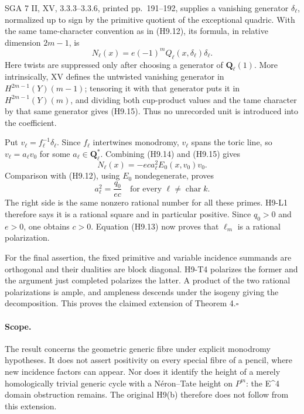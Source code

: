 SGA 7 II, XV, 3.3.3--3.3.6, printed pp.~191--192, supplies a vanishing generator
$\delta_\ell$, normalized up to sign by the primitive quotient of the
exceptional quadric. With the same tame-character convention as in
(H9.12), its formula, in relative dimension $2m-1$, is
\[
 N_\ell(x)=e(-1)^m Q_\ell(x,\delta_\ell)\delta_\ell.
                                                        \tag{H9.15}
\]
Here twists are suppressed only after choosing a generator of
$\mathbf Q_\ell(1)$. More intrinsically, XV defines the untwisted
vanishing generator in $H^{2m-1}(Y)(m-1)$; tensoring it with that
generator puts it in $H^{2m-1}(Y)(m)$, and dividing both cup-product
values and the tame character by that same generator gives (H9.15).
Thus no unrecorded unit is introduced into the coefficient.

Put $v_\ell=f_\ell^{-1}\delta_\ell$. Since $f_\ell$ intertwines
monodromy, $v_\ell$ spans the toric line, so
$v_\ell=a_\ell v_0$ for some $a_\ell\in\mathbf Q_\ell^*$.
Combining (H9.14) and (H9.15) gives
\[
 N_\ell(x)=-e c a_\ell^2 E_0(x,v_0)v_0.
\]
Comparison with (H9.12), using $E_0$ nondegenerate, proves
\[
 a_\ell^2=\frac{q_0}{e c}\quad\text{for every }\ell\ne
 \operatorname{char}k.                                \tag{H9.16}
\]
The right side is the same nonzero rational number for all these primes.
H9-L1 therefore says it is a rational square and in particular positive.
Since $q_0>0$ and $e>0$, one obtains $c>0$. Equation (H9.13) now proves
that $\ell_m$ is a rational polarization.

For the final assertion, the fixed primitive and variable incidence
summands are orthogonal and their dualities are block diagonal.
H9-T4 polarizes the former and the argument just completed polarizes
the latter. A product of the two rational polarizations is ample,
and ampleness descends under the isogeny giving the decomposition.
This proves the claimed extension of Theorem 4.\hfill$\square$

\paragraph{Scope.}
The result concerns the geometric generic fibre under explicit monodromy
hypotheses. It does not assert positivity on every special fibre of a
pencil, where new incidence factors can appear. Nor does it identify
the height of a merely homologically trivial generic cycle with a
N\'eron--Tate height on $P^m$: the E^4 domain obstruction remains.
The original H9(b) therefore does not follow from this extension.
